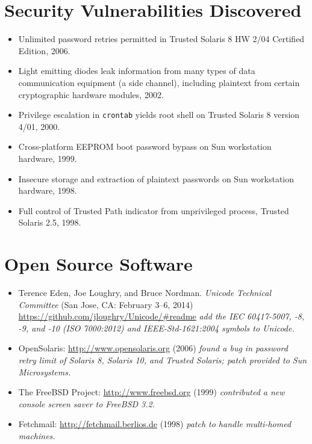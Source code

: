 \documentclass[12pt,twoside,letterpaper]{article}
\begin{document}
\setlength{\fboxsep}{0pt}

\vspace{-8mm}
\section*{Security Vulnerabilities Discovered}
\vspace{-2mm}
\begin{itemize}
	\item Unlimited password retries permitted in Trusted Solaris 8 HW 2/04
		Certified Edition, 2006.\vspace{-2mm}
	\item Light emitting diodes leak information from many types of data
		communication equipment (a side channel), including plaintext from
		certain cryptographic hardware modules, 2002.\vspace{-1.5mm}
	\item Privilege escalation in \verb,crontab, yields root shell on Trusted
		Solaris 8 version 4/01, 2000.\vspace{-2mm}
	\item Cross-platform EEPROM boot password bypass on Sun workstation
		hardware, 1999.\vspace{-2mm}
	\item Insecure storage and extraction of plaintext passwords on Sun workstation
		hardware, 1998.\vspace{-2mm}
	\item Full control of Trusted Path indicator from unprivileged process,
		Trusted Solaris 2.5, 1998.\vspace{-2mm}
\end{itemize}


\section*{Open Source Software}
\vspace{-2mm}
\begin{itemize}
	\item Terence Eden, Joe Loughry, and Bruce Nordman. \emph{Unicode
		Technical Committee} (San Jose, CA: February 3--6, 2014)
		\url{https://github.com/jloughry/Unicode/#readme} \emph{add
		the IEC 60417-5007, -8, -9, and -10 (ISO 7000:2012) and
		IEEE-Std-1621:2004 symbols to Unicode.}
	\item OpenSolaris: \url{http://www.opensolaris.org} (2006)
		\emph{found a bug in password retry limit of Solaris 8, Solaris 10,
		and Trusted Solaris; patch provided to Sun Microsystems.}
	\item The FreeBSD Project: \url{http://www.freebsd.org} (1999)
		\emph{contributed a new console screen saver to FreeBSD 3.2.}
	\item Fetchmail: \url{http://fetchmail.berlios.de} (1998)
		\emph{patch to handle multi-homed machines.}
\end{itemize}
\end{document}
